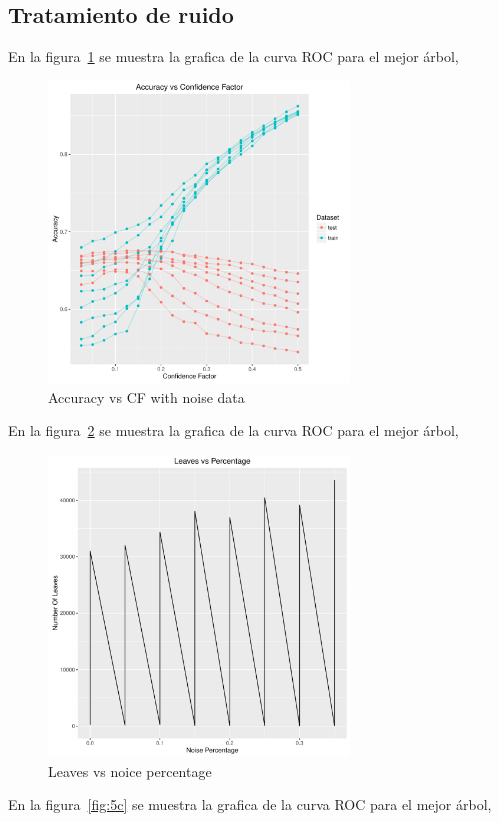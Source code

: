 \subsection{Tratamiento de ruido}

En la figura~\ref{fig:5a} se muestra la grafica de la curva ROC para el mejor árbol,

\begin{figure}
  \centering
  \includegraphics[width = 8cm]{5a.pdf}
  \caption{Accuracy vs CF with noise data}
  \label{fig:5a}
\end{figure}

En la figura~\ref{fig:5b} se muestra la grafica de la curva ROC para el mejor árbol,

\begin{figure}
  \centering
  \includegraphics[width = 8cm]{5b.pdf}
  \caption{Leaves vs noice percentage}
  \label{fig:5b}
\end{figure}

En la figura~\ref{fig:5c} se muestra la grafica de la curva ROC para el mejor árbol,

